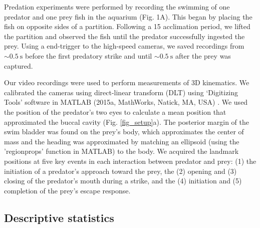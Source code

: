 \documentclass[]{rsos}%
\begin{document}
Predation experiments were performed by recording the swimming of one predator and one prey fish in the aquarium (Fig. 1A). 
This began by placing the fish on opposite sides of a partition.
Following a \SI{15}{\min} acclimation period, we lifted the partition and observed the fish until the predator successfully ingested the prey.
Using a end-trigger to the high-speed cameras, we saved recordings from $\sim \SI{0.5}{\s}$ before the first predatory strike and until $\sim \SI{0.5}{\s}$  after the prey was captured.

Our video recordings were used to perform measurements of 3D kinematics. 
We calibrated the cameras using direct-linear transform (DLT) using `Digitizing Tools' software in MATLAB (2015a, MathWorks, Natick, MA, USA) \cite{Hedrick:2008wz}.
We used the position of the predator's two eyes to calculate a mean position that approximated the buccal cavity (Fig. \ref{fig_setup}a).
The posterior margin of the swim bladder was found on the prey's body, which approximates the center of mass \cite{Stewart:2010ig} and the heading was approximated by matching an ellipsoid (using the 'regionprops' function in MATLAB) to the body.
We acquired the landmark positions at five key events in each interaction between predator and prey: (1) the initiation of a predator's approach toward the prey, the (2) opening and (3) closing of the predator's mouth during a strike, and the (4) initiation and (5) completion of the prey's escape response.


\subsection{Descriptive statistics}
\end{document}
